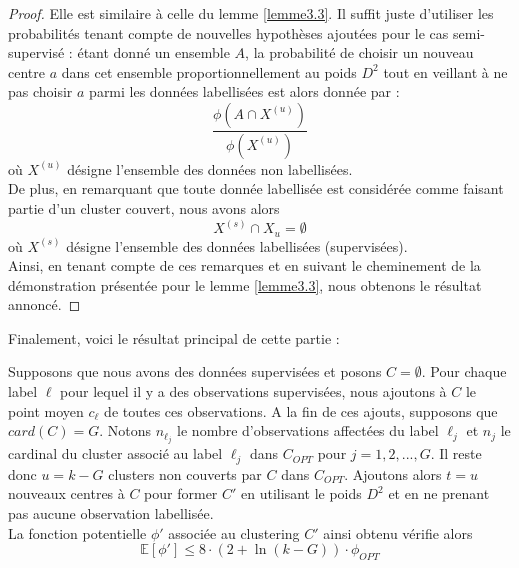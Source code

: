 \documentclass[12pt,a4paper]{book}
\newcommand{\E}{\mathbb{E}}
\newcommand{\1}{\mathds{1}}
\begin{document}
	\begin{proof}
		Elle est similaire à celle du lemme \ref{lemme3.3}.
		Il suffit juste d'utiliser les probabilités tenant compte de nouvelles hypothèses ajoutées pour le cas semi-supervisé : étant donné un ensemble $A$, la probabilité de choisir un nouveau centre $a$ dans cet ensemble proportionnellement au poids $D^2$ tout en veillant à ne pas choisir $a$ parmi les données labellisées est alors donnée par :
		$$
			\frac{\phi \left( A \cap X^{(u)} \right)}{\phi \left(X^{(u)}\right)}
		$$ 
		où $X^{(u)}$ désigne l'ensemble des données non labellisées.\\
		
		De plus, en remarquant que toute donnée labellisée est considérée comme faisant partie d'un cluster couvert,  nous avons alors
		$$
			X^{(s)} \cap X_u = \emptyset
		$$
		où $X^{(s)}$ désigne l'ensemble des données labellisées (supervisées).\\
		
		Ainsi, en tenant compte de ces remarques et en suivant le cheminement de la démonstration présentée pour le lemme \ref{lemme3.3}, nous obtenons le résultat annoncé.
	\end{proof}	
	
	Finalement, voici le résultat principal de cette partie :
	
	\begin{theorem}\label{theoreme4.7}
		Supposons que nous avons des données supervisées et posons $C = \emptyset$. Pour chaque label $\ell$ pour lequel il y a des observations supervisées, nous ajoutons à $C$ le point moyen $c_\ell$ de toutes ces observations. A la fin de ces ajouts, supposons que $card(C)=G$. Notons $n_{\ell_j}$ le nombre d'observations affectées du label $\ell_j$ et $n_j$ le cardinal du cluster associé au label $\ell_j$ dans $C_{OPT}$  pour $j = 1, 2, ..., G$. Il reste donc $u=k-G$ clusters non couverts par $C$ dans $C_{OPT}$. Ajoutons alors $t=u$ nouveaux centres à $C$ pour former $C'$ en utilisant le poids $D^2$ et en ne prenant pas aucune observation labellisée.\\
		La fonction potentielle $\phi'$ associée au clustering $C'$ ainsi obtenu vérifie alors
		$$
			\E[\phi'] \leq 8 \cdot \left(2 + \ln (k - G) \right) \cdot \phi_{OPT}
		$$ 
	\end{theorem}
	
\end{document}
